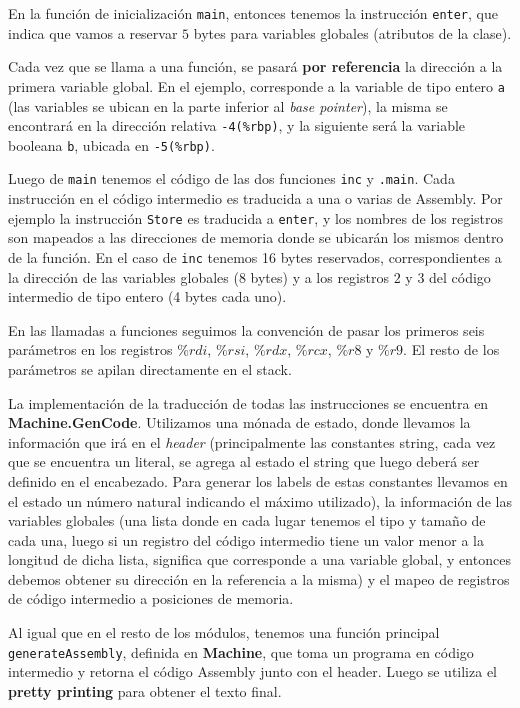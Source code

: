 \documentclass[a4paper,10pt]{article}
\begin{document}
En la función de inicialización \verb|main|, entonces tenemos la instrucción \verb|enter|, que indica que
vamos a reservar $5$ bytes para variables globales (atributos de la clase). 

Cada vez que se llama a una función, se pasará \textbf{por referencia} la dirección
a la primera variable global. 
En el ejemplo, corresponde a la variable de tipo entero \verb|a| (las variables se ubican en la parte inferior al \textit{base pointer}),
la misma se encontrará en la dirección relativa \verb|-4(%rbp)|, y la siguiente será la variable booleana \verb|b|, ubicada en \verb|-5(%rbp)|. 


Luego de \verb|main| tenemos el código de las dos funciones \verb|inc| y \verb|.main|. Cada instrucción en el código intermedio es traducida a una o varias
de Assembly. Por ejemplo la instrucción \verb|Store| es traducida a \verb|enter|, y los nombres de los registros son mapeados a las direcciones
de memoria donde se ubicarán los mismos dentro de la función. En el caso de \verb|inc| tenemos 16 bytes reservados, correspondientes a la dirección de las variables
globales (8 bytes) y a los registros $2$ y $3$ del código intermedio de tipo entero (4 bytes cada uno).

En las llamadas a funciones seguimos la convención de pasar los primeros seis 
parámetros en los registros $\%rdi$, $\%rsi$, $\%rdx$, $\%rcx$, $\%r8$ y $\%r9$. El resto de los parámetros se apilan directamente en el stack.

La implementación de la traducción de todas las instrucciones se encuentra en \textbf{Machine.GenCode}. Utilizamos una mónada de estado, donde
llevamos la información que irá en el \textit{header} (principalmente las constantes string, cada vez que se encuentra un literal, se agrega al estado
el string que luego deberá ser definido en el encabezado. Para generar los labels de estas constantes llevamos en el estado un número natural indicando
el máximo utilizado), la información de las variables globales (una lista donde en cada lugar tenemos el tipo y tamaño de cada una, luego si 
un registro del código intermedio tiene un valor menor a la longitud de dicha lista, significa que corresponde a una variable global, y entonces
debemos obtener su dirección en la referencia a la misma) y el mapeo de registros de código intermedio a posiciones de memoria.

Al igual que en el resto de los módulos, tenemos una función principal \verb|generateAssembly|, definida en \textbf{Machine}, que toma un programa
en código intermedio y retorna el código Assembly junto con el header. Luego se utiliza el \textbf{pretty printing} para obtener el texto final.
\end{document}
